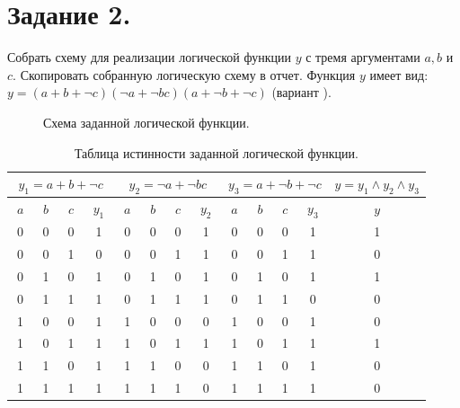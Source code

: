 \documentclass[spec, och, otchet, hidelinks]{SCWorks}
\begin{document}
\newpage

\section*{Задание 2.}

\par Собрать схему для реализации логической функции $ y $ с тремя аргументами $ a, b $ и $ c. $
Скопировать собранную логическую схему в отчет. Функция $ y $ имеет вид: $ y = (a + b + \neg c)
(\neg a + \neg b c)(a + \neg b + \neg c) $ (вариант ).

\begin{figure}[h]
	\caption{Схема заданной логической функции.}
\end{figure}

\begin{table}[h]
	\captionsetup{justification=centering}
	\begin{tabular}{|c|c|c|c|c|c|c|c|c|c|c|c|c|}
		\hline
		\multicolumn{4}{|c|}{$ y_1 = a + b + \neg c $} & \multicolumn{4}{|c|}{$ y_2 = \neg a + \neg b c $} & 
		\multicolumn{4}{|c|}{$ y_3 = a + \neg b + \neg c $} & $ y = y_1 \wedge y_2 \wedge y_3 $ \\
		\hline
		$ \; a \; $ & $ \; b \; $ & $ \; c \; $ & $ \; y_1 \; $ & 
		$ \; a \; $ & $ \; b \; $ & $ \; c \; $ & $ \; y_2 \; $ &
		$ \; a \; $ & $ \; b \; $ & $ \; c \; $ & $ \; y_3 \; $ &
		$ y $ \\
		\hline
		0 & 0 & 0 & 1 & 0 & 0 & 0 & 1 & 0 & 0 & 0 & 1 & 1 \\
		\hline
		0 & 0 & 1 & 0 & 0 & 0 & 1 & 1 & 0 & 0 & 1 & 1 & 0 \\
		\hline
		0 & 1 & 0 & 1 & 0 & 1 & 0 & 1 & 0 & 1 & 0 & 1 & 1 \\
		\hline
		0 & 1 & 1 & 1 & 0 & 1 & 1 & 1 & 0 & 1 & 1 & 0 & 0 \\
		\hline
		1 & 0 & 0 & 1 & 1 & 0 & 0 & 0 & 1 & 0 & 0 & 1 & 0 \\
		\hline
		1 & 0 & 1 & 1 & 1 & 0 & 1 & 1 & 1 & 0 & 1 & 1 & 1 \\
		\hline
		1 & 1 & 0 & 1 & 1 & 1 & 0 & 0 & 1 & 1 & 0 & 1 & 0 \\
		\hline
		1 & 1 & 1 & 1 & 1 & 1 & 1 & 0 & 1 & 1 & 1 & 1 & 0 \\
		\hline
	\end{tabular}
	\caption{Таблица истинности заданной логической функции.}
\end{table}
\end{document}
